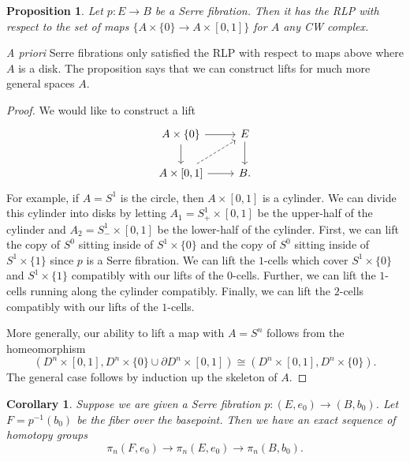 \documentclass{article}
\newtheorem{proposition}[theorem]{Proposition}
\newtheorem{corollary}[theorem]{Corollary}
\newtheorem{proposed work}[theorem]{Proposed Work}
\begin{document}
\begin{proposition}
Let $p : E \to B$ be a Serre fibration. Then it has the RLP with respect to the set of maps $\{A \times \{0\} \to A \times [0,1]\}$ for $A$ any CW complex. 
\end{proposition}

\emph{A priori} Serre fibrations only satisfied the RLP with respect to maps above where $A$ is a disk. The proposition says that we can construct lifts for much more general spaces $A$. 

\begin{proof}
We would like to construct a lift
\[
\begin{tikzcd}
A \times \{0 \} \arrow[r] \arrow[d] & E \arrow[d] \\
A \times [0,1] \arrow[r] \arrow[dashed,ur]  & B .
\end{tikzcd}
\]
For example, if $A = S^1$ is the circle, then $A \times [0,1]$ is a cylinder. We can divide this cylinder into disks by letting $A_1 = S^1_+ \times [0,1]$ be the upper-half of the cylinder and $A_2 = S^1_- \times [0,1]$ be the lower-half of the cylinder. First, we can lift the copy of $S^0$ sitting inside of $S^1 \times \{0\}$ and the copy of $S^0$ sitting inside of $S^1 \times \{1\}$ since $p$ is a Serre fibration. We can lift the $1$-cells which cover $S^1 \times \{0\}$ and $S^1 \times \{1\}$ compatibly with our lifts of the $0$-cells. Further, we can lift the $1$-cells running along the cylinder compatibly. Finally, we can lift the $2$-cells compatibly with our lifts of the $1$-cells. 

More generally, our ability to lift a map with $A = S^n$  follows from the homeomorphism
$$(D^n \times [0,1], D^n \times \{0\} \cup \partial D^n \times [0,1]) \cong (D^n \times [0,1], D^n \times \{0\}).$$
The general case follows by induction up the skeleton of $A$.  
\end{proof}

\begin{corollary}\label{sesfib}
Suppose we are given a Serre fibration $p : (E,e_0) \to (B,b_0)$. Let $F = p^{-1}(b_0)$ be the fiber over the basepoint. Then we have an exact sequence of homotopy groups
$$\pi_n(F,e_0) \to \pi_n(E,e_0) \to \pi_n(B,b_0).$$
\end{corollary}
\end{document}
